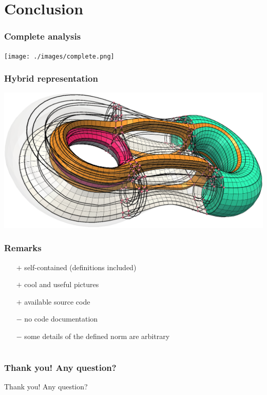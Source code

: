 \documentclass[12pt]{beamer}
\begin{document}
\section{Conclusion}

\begin{frame}
  \frametitle{Complete analysis}
  \texttt{[image: ./images/complete.png]}
\end{frame}

\begin{frame}
  \frametitle{Hybrid representation}
  \includegraphics[width=\textwidth]{./images/hybrid.png}
\end{frame}

\begin{frame}
  \frametitle{Remarks}
  \begin{itemize}
    \item[$+$] self-contained (definitions included)
    \item[$+$] cool and useful pictures
    \item[$+$] available source code
    \item[$-$] no code documentation
    \item[$-$] some details of the defined norm are arbitrary
  \end{itemize}
\end{frame}

\section*{}

\begin{frame}
  \frametitle{Thank you! Any question?}
  \begin{center}
    Thank you! Any question?
  \end{center}
\end{frame}
\end{document}
